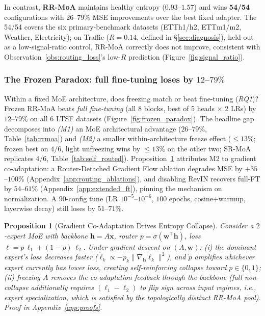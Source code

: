 \documentclass{article}
\newtheorem{proposition}{Proposition}
\begin{document}
In contrast, \textbf{RR-MoA} maintains healthy entropy ($0.93$--$1.57$) and wins \textbf{54/54} configurations with $26$--$79\%$ MSE improvements over the best fixed adapter. The 54/54 covers the six primary-benchmark datasets (ETTh1/h2, ETTm1/m2, Weather, Electricity); on Traffic ($R{=}0.14$, defined in \S\ref{sec:diagnosis}), held out as a low-signal-ratio control, RR-MoA correctly does not improve, consistent with Observation~\ref{obs:routing_loss}'s low-$R$ prediction (Figure~\ref{fig:signal_ratio}).

\subsubsection*{The Frozen Paradox: full fine-tuning loses by $12$--$79\%$}

{ Within a fixed MoE architecture, does freezing match or beat fine-tuning (\emph{RQ1})? Frozen RR-MoA beats \emph{full fine-tuning} (all 8 blocks, best of 5 heads $\times$ 2 LRs) by $12$--$79\%$ on all 6 LTSF datasets (Figure~\ref{fig:frozen_paradox}). The headline gap decomposes into \emph{(M1)} an MoE architectural advantage ($26$--$79\%$, Table~\ref{tab:rrmoa}) and \emph{(M2)} a smaller within-architecture freeze effect ($\leq 13\%$; frozen best on $4/6$, light unfreezing wins by ${\leq}13\%$ on the other two; SR-MoA replicates $4/6$, Table~\ref{tab:self_routed}). Proposition~\ref{prop:frozen} attributes M2 to gradient co-adaptation: a Router-Detached Gradient Flow ablation degrades MSE by $+35$--$100\%$ (Appendix~\ref{app:routing_ablations}), and disabling RevIN recovers full-FT by $54$--$61\%$ (Appendix~\ref{app:extended_ft}), pinning the mechanism on normalization. A $90$-config tune (LR $10^{-5}$--$10^{-6}$, $100$ epochs, cosine+warmup, layerwise decay) still loses by $51$--$71\%$.}

\begin{proposition}[Gradient Co-Adaptation Drives Entropy Collapse]
\label{prop:frozen}
Consider a $2$-expert MoE with backbone $\mathbf{h}{=}A\mathbf{x}$, router $p{=}\sigma(\mathbf{w}^\top\mathbf{h})$, loss $\ell{=}p\,\ell_1{+}(1{-}p)\,\ell_2$. Under gradient descent on $(A,\mathbf{w})$: \textup{(i)} the dominant expert's loss decreases faster ($\dot{\ell}_k \propto {-}p_k\|\nabla_\mathbf{h}\ell_k\|^2$), and $\dot{p}$ amplifies whichever expert currently has lower loss, creating self-reinforcing collapse toward $p{\in}\{0,1\}$; \textup{(ii)} freezing $A$ removes the co-adaptation feedback through the backbone (full non-collapse additionally requires $(\ell_1{-}\ell_2)$ to flip sign across input regimes, i.e., expert specialization, which is satisfied by the topologically distinct RR-MoA pool). Proof in Appendix~\ref{app:proofs}.
\end{proposition}
\end{document}
